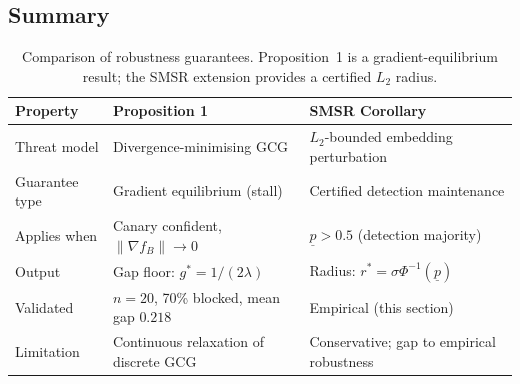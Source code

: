 \subsection{Summary}

\begin{table}[h]
\centering
\small
\caption{Comparison of robustness guarantees. Proposition~1 is a gradient-equilibrium result; the SMSR extension provides a certified $L_2$ radius.}
\label{tab:robustness-comparison}
\begin{tabular}{lll}
\toprule
\textbf{Property} & \textbf{Proposition 1} & \textbf{SMSR Corollary} \\
\midrule
Threat model & Divergence-minimising GCG & $L_2$-bounded embedding perturbation \\
Guarantee type & Gradient equilibrium (stall) & Certified detection maintenance \\
Applies when & Canary confident, $\|\nabla f_B\| \to 0$ & $\underline{p} > 0.5$ (detection majority) \\
Output & Gap floor: $g^* = 1/(2\lambda)$ & Radius: $r^* = \sigma\Phi^{-1}(\underline{p})$ \\
Validated & $n=20$, 70\% blocked, mean gap $0.218$ & Empirical (this section) \\
Limitation & Continuous relaxation of discrete GCG & Conservative; gap to empirical robustness \\
\bottomrule
\end{tabular}
\end{table}


